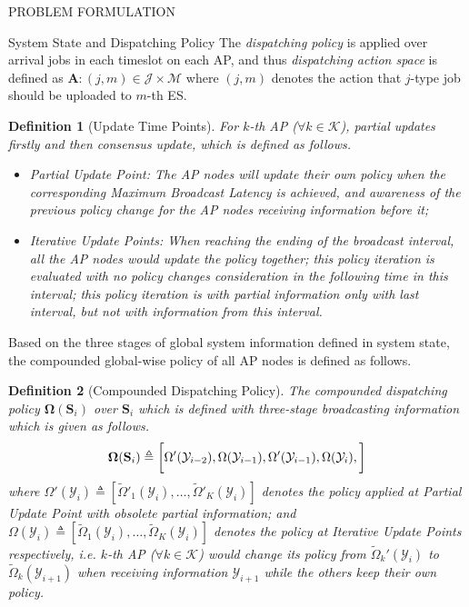 \documentclass[10pt, conference, letterpaper]{IEEEtran}
\newtheorem{definition}{Definition}
\newcommand{\define}{\triangleq}
\DeclarePairedDelimiter{\Bracket}{\bigg[}{\bigg]}
\newcommand{\apSet}{\mathcal{K}}
\newcommand{\esSet}{\mathcal{M}}
\newcommand{\jSpace}{\mathcal{J}}
\newcommand{\Stat}{\mathbf{S}}
\newcommand{\Obsv}{\mathcal{Y}}
\newcommand{\Policy}{\boldsymbol{\Omega}}
\begin{document}
\begin{section}{PROBLEM FORMULATION}
\begin{subsection}{System State and Dispatching Policy}
            The \emph{dispatching policy} is applied over arrival jobs in each timeslot on each AP, and thus \emph{dispatching action space} is defined as $\mathbf{A}: (j, m) \in \jSpace \times \esSet$ where $(j, m)$ denotes the action that $j$-type job should be uploaded to $m$-th ES.
            \begin{definition}[Update Time Points]
                For $k$-th AP ($\forall k\in\apSet$), partial updates firstly and then consensus update, which is defined as follows.
                \begin{itemize}
                    \item Partial Update Point: The AP nodes will update their own policy when the corresponding \emph{Maximum Broadcast Latency} is achieved, and awareness of the previous policy change for the AP nodes receiving information before it;
                    \item Iterative Update Points: When reaching the ending of the broadcast interval, all the AP nodes would update the policy together;
                    this policy iteration is evaluated with no policy changes consideration in the following time in this interval;
                    this policy iteration is with partial information only with last interval, but not with information from this interval.
                \end{itemize}
            \end{definition}
            
            Based on the three stages of global system information defined in system state, the compounded global-wise policy of all AP nodes is defined as follows.
            \begin{definition}[Compounded Dispatching Policy]
                The compounded dispatching policy $\Policy(\Stat_{i})$ over $\Stat_{i}$ which is defined with three-stage broadcasting information which is given as follows.
                \begin{align}
                    \Policy(\Stat_{i}) \define \Bracket{
                        \Omega'(\Obsv_{i-2}), \Omega(\Obsv_{i-1}), \Omega'(\Obsv_{i-1}), \Omega(\Obsv_{i}),
                    }
                \end{align}
                where $\Omega'(\Obsv_i) \define [\tilde{\Omega}'_{1}(\Obsv_i), \dots, \tilde{\Omega}'_{K}(\Obsv_i)]$ denotes the policy applied at \emph{Partial Update Point} with obsolete partial information; and $\Omega(\Obsv_i) \define [\tilde{\Omega}_{1}(\Obsv_i), \dots, \tilde{\Omega}_{K}(\Obsv_i)]$ denotes the policy at \emph{Iterative Update Points} respectively, i.e. $k$-th AP ($\forall k\in\apSet$) would change its policy from $\tilde{\Omega}_{k}'(\Obsv_i)$ to $\tilde{\Omega}_{k}(\Obsv_{i+1})$ when receiving information $\Obsv_{i+1}$ while the others keep their own policy.
                

\end{definition}
\end{subsection}
\end{section}
\end{document}
